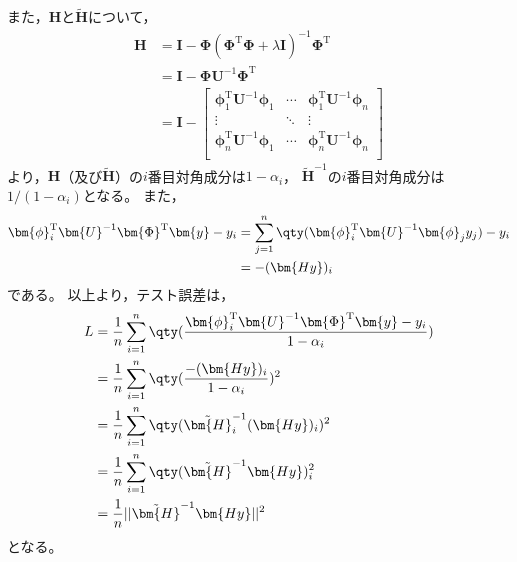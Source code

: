\documentclass[class=jsarticle, crop=false, dvipdfmx, fleqn]{standalone}
\begin{document}
また，\(\bm{H}\)と\(\tilde{\bm{H}}\)について，
\begin{align}
    \bm{H}
        & = \bm{I} - \bm{\Phi} (\bm{\Phi}^\mathrm{T} \bm{\Phi} + \lambda \bm{I})^{-1} \bm{\Phi}^\mathrm{T} \\
        & = \bm{I} - \bm{\Phi} \bm{U}^{-1} \bm{\Phi}^\mathrm{T} \\
        & = \bm{I} -
            \begin{bmatrix}
                \bm{\phi}_1^\mathrm{T} \bm{U}^{-1} \bm{\phi}_1 & \cdots & \bm{\phi}_1^\mathrm{T} \bm{U}^{-1} \bm{\phi}_n \\
                \vdots & \ddots & \vdots \\
                \bm{\phi}_n^\mathrm{T} \bm{U}^{-1} \bm{\phi}_1 & \cdots & \bm{\phi}_n^\mathrm{T} \bm{U}^{-1} \bm{\phi}_n \\
            \end{bmatrix}
\end{align}
より，\(\bm{H}\)（及び\(\tilde{\bm{H}}\)）の\(i\)番目対角成分は\(1 - \alpha_i\)，
\(\tilde{\bm{H}}^{-1}\)の\(i\)番目対角成分は\(1/(1 - \alpha_i)\)となる。
また，
\begin{align}
    \bm{\phi}_i^\mathrm{T} \bm{U}^{-1} \bm{\Phi}^\mathrm{T} \bm{y} - y_i
        & = \sum_{j=1}^{n} \qty(\bm{\phi}_i^\mathrm{T} \bm{U}^{-1} \bm{\phi}_j y_j) - y_i \\
        & = -(\bm{Hy})_i
\end{align}
である。
以上より，テスト誤差は，
\begin{align}
    L
        & = \frac{1}{n} \sum_{i=1}^n \qty(\frac{\bm{\phi}_i^\mathrm{T} \bm{U}^{-1} \bm{\Phi}^\mathrm{T} \bm{y} - y_i}{1 - \alpha_i}) \\
        & = \frac{1}{n} \sum_{i=1}^n \qty(\frac{-(\bm{Hy})_i}{1 - \alpha_i})^2 \\
        & = \frac{1}{n} \sum_{i=1}^n \qty(\tilde{\bm{H}}_i^{-1} (\bm{Hy})_i)^2 \\
        & = \frac{1}{n} \sum_{i=1}^n \qty(\tilde{\bm{H}}^{-1} \bm{Hy})_i^2 \\
        & = \frac{1}{n} ||\tilde{\bm{H}}^{-1} \bm{Hy}||^2
\end{align}
となる。
\end{document}
